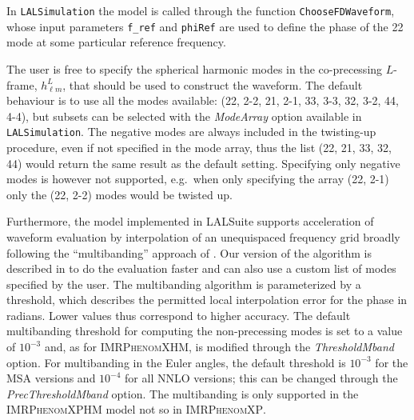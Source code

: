 \documentclass[%
aps,
prd,
amssymb,
amsmath,
amsfonts,
eqsecnum,
showpacs,
nofootinbib,
floatfix,
twocolumn,
twoside,
a4paper,
superscriptaddress
]{revtex4-1}
\newcommand{\phXP}{\textsc{IMRPhenomXP}\xspace}
\newcommand{\phXPHM}{\textsc{IMRPhenomXPHM}\xspace}
\begin{document}
In \texttt{LALSimulation} the model is called through the function \texttt{ChooseFDWaveform}, whose input parameters \texttt{f\_ref} and \texttt{phiRef} are used to define the phase of the 22 mode at some particular reference frequency. 

The user is free to specify the spherical harmonic modes in the co-precessing $L$-frame, $h^{L}_{\ell m}$, that should be used to construct the waveform. The default behaviour is to use
all the modes available: (22, 2-2, 21, 2-1, 33, 3-3, 32, 3-2, 44, 4-4), but subsets can be selected with the \textit{ModeArray} option available in \texttt{LALSimulation}. The negative modes are always included in the twisting-up procedure, even if not specified in the mode array, thus the list (22, 21, 33, 32, 44) would return the same result as the default setting. Specifying only negative modes is however not supported, e.g.~when only specifying the array (22, 2-1) only the (22, 2-2) modes would be twisted up.

Furthermore, the model implemented in LALSuite supports acceleration of waveform evaluation by interpolation of an unequispaced frequency grid broadly following the ``multibanding'' approach of \cite{Vinciguerra:2017ngf}. Our version of the algorithm is described in 
\cite{Garcia-Quiros:2020qlt} to do the evaluation faster and can also use a custom list of modes specified by the user.
The multibanding algorithm is parameterized by a threshold, which describes the permitted local interpolation error for the phase in radians. Lower values 
thus correspond to higher accuracy.
The default multibanding threshold for computing the non-precessing modes is set to a value of $10^{-3}$ and, as for \textsc{IMRPhenomXHM}, is modified through the \textit{ThresholdMband} option.
For multibanding in the Euler angles, the default threshold is $10^{-3}$ for the MSA versions and $10^{-4}$ for all NNLO versions; this can be changed through the \textit{PrecThresholdMband} option. The multibanding is only supported in the \phXPHM model not so in \phXP.
\end{document}
